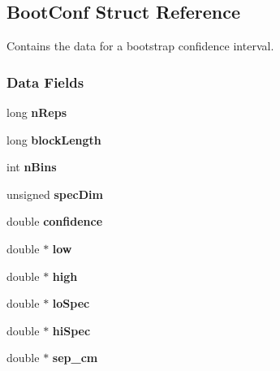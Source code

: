 \hypertarget{struct_boot_conf}{\subsection{\-Boot\-Conf \-Struct \-Reference}
\label{struct_boot_conf}
}


\-Contains the data for a bootstrap confidence interval.  


\subsubsection*{\-Data \-Fields}
\begin{DoxyCompactItemize}
\item 
\hypertarget{struct_boot_conf_ad7d61e383dfef5ae24ec8dea59feda3d}{long {\bfseries n\-Reps}}\label{struct_boot_conf_ad7d61e383dfef5ae24ec8dea59feda3d}

\item 
\hypertarget{struct_boot_conf_abd095b45e3b74b9da1abad14d9abf501}{long {\bfseries block\-Length}}\label{struct_boot_conf_abd095b45e3b74b9da1abad14d9abf501}

\item 
\hypertarget{struct_boot_conf_a3d42d32697c1d9f7371b4fdc75c7ab7a}{int {\bfseries n\-Bins}}\label{struct_boot_conf_a3d42d32697c1d9f7371b4fdc75c7ab7a}

\item 
\hypertarget{struct_boot_conf_a7a437032f1680e0fad2100cb6a6e2578}{unsigned {\bfseries spec\-Dim}}\label{struct_boot_conf_a7a437032f1680e0fad2100cb6a6e2578}

\item 
\hypertarget{struct_boot_conf_a755fb4fbfa8e079445e1c6a8298446f9}{double {\bfseries confidence}}\label{struct_boot_conf_a755fb4fbfa8e079445e1c6a8298446f9}

\item 
\hypertarget{struct_boot_conf_aed2ad2c316f488f9d44879571db8cd43}{double $\ast$ {\bfseries low}}\label{struct_boot_conf_aed2ad2c316f488f9d44879571db8cd43}

\item 
\hypertarget{struct_boot_conf_a0daa885809da2a6e7599bced779127d9}{double $\ast$ {\bfseries high}}\label{struct_boot_conf_a0daa885809da2a6e7599bced779127d9}

\item 
\hypertarget{struct_boot_conf_a3635f0a98deeb352cd912a5814778563}{double $\ast$ {\bfseries lo\-Spec}}\label{struct_boot_conf_a3635f0a98deeb352cd912a5814778563}

\item 
\hypertarget{struct_boot_conf_af893ee60441053801f6998c51b0cae92}{double $\ast$ {\bfseries hi\-Spec}}\label{struct_boot_conf_af893ee60441053801f6998c51b0cae92}

\item 
\hypertarget{struct_boot_conf_a9c77f42dd63b54e4c46fe697982d63ef}{double $\ast$ {\bfseries sep\-\_\-cm}}\label{struct_boot_conf_a9c77f42dd63b54e4c46fe697982d63ef}

\end{DoxyCompactItemize}



